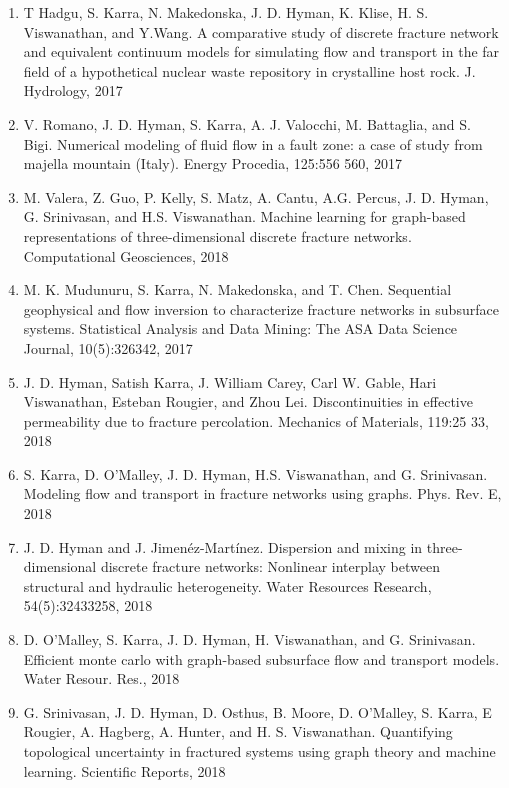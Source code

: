 \documentclass[letterpaper,10pt,english]{sphinxmanual}
\begin{document}
\begin{enumerate}
\item {} 
T Hadgu, S. Karra, N. Makedonska, J. D. Hyman, K. Klise, H. S. Viswanathan, and Y.Wang. A comparative study of discrete fracture network and equivalent continuum models for simulating flow and transport in the far field of a hypothetical nuclear waste repository in crystalline host rock. J. Hydrology, 2017

\item {} 
V. Romano, J. D. Hyman, S. Karra, A. J. Valocchi, M. Battaglia, and S. Bigi. Numerical modeling of fluid flow in a fault zone: a case of study from majella mountain (Italy). Energy Procedia, 125:556 \textendash{} 560, 2017

\item {} 
M. Valera, Z. Guo, P. Kelly, S. Matz, A. Cantu, A.G. Percus, J. D. Hyman, G. Srinivasan, and H.S. Viswanathan. Machine learning for graph-based representations of three-dimensional discrete fracture networks. Computational Geosciences, 2018

\item {} 
M. K. Mudunuru, S. Karra, N. Makedonska, and T. Chen. Sequential geophysical and flow inversion to characterize fracture networks in subsurface systems. Statistical Analysis and Data Mining: The ASA Data Science Journal, 10(5):326\textendash{}342, 2017

\item {} 
J. D. Hyman, Satish Karra, J. William Carey, Carl W. Gable, Hari Viswanathan, Esteban Rougier, and Zhou Lei. Discontinuities in effective permeability due to fracture percolation. Mechanics of Materials, 119:25 \textendash{} 33, 2018

\item {} 
S. Karra, D. O’Malley, J. D. Hyman, H.S. Viswanathan, and G. Srinivasan. Modeling flow and transport in fracture networks using graphs. Phys. Rev. E, 2018

\item {} 
J. D. Hyman and J. Jimenéz-Martínez. Dispersion and mixing in three-dimensional discrete fracture networks: Nonlinear interplay between structural and hydraulic heterogeneity. Water Resources Research, 54(5):3243\textendash{}3258, 2018

\item {} 
D. O’Malley, S. Karra, J. D. Hyman, H. Viswanathan, and G. Srinivasan. Efficient monte carlo with graph-based subsurface flow and transport models. Water Resour. Res., 2018

\item {} 
G. Srinivasan, J. D. Hyman, D. Osthus, B. Moore, D. O’Malley, S. Karra, E Rougier, A. Hagberg, A. Hunter, and H. S. Viswanathan. Quantifying topological uncertainty in fractured systems using graph theory and machine learning. Scientific Reports, 2018


\end{enumerate}
\end{document}
